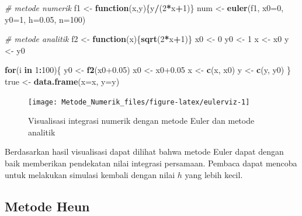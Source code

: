 \documentclass[]{book}
\newenvironment{Shaded}{\begin{snugshade}}{\end{snugshade}}
\newcommand{\CommentTok}[1]{\textcolor[rgb]{0.56,0.35,0.01}{\textit{#1}}}
\newcommand{\ControlFlowTok}[1]{\textcolor[rgb]{0.13,0.29,0.53}{\textbf{#1}}}
\newcommand{\DataTypeTok}[1]{\textcolor[rgb]{0.13,0.29,0.53}{#1}}
\newcommand{\DecValTok}[1]{\textcolor[rgb]{0.00,0.00,0.81}{#1}}
\newcommand{\FloatTok}[1]{\textcolor[rgb]{0.00,0.00,0.81}{#1}}
\newcommand{\KeywordTok}[1]{\textcolor[rgb]{0.13,0.29,0.53}{\textbf{#1}}}
\newcommand{\NormalTok}[1]{#1}
\newcommand{\OperatorTok}[1]{\textcolor[rgb]{0.81,0.36,0.00}{\textbf{#1}}}
\newcommand{\StringTok}[1]{\textcolor[rgb]{0.31,0.60,0.02}{#1}}
\theoremstyle{definition}
\theoremstyle{definition}
\theoremstyle{definition}
\theoremstyle{remark}
\begin{document}
\begin{Shaded}
\begin{Highlighting}[]
\CommentTok{# metode numerik}
\NormalTok{f1 <-}\StringTok{ }\ControlFlowTok{function}\NormalTok{(x,y)\{y}\OperatorTok{/}\NormalTok{(}\DecValTok{2}\OperatorTok{*}\NormalTok{x}\OperatorTok{+}\DecValTok{1}\NormalTok{)\}}
\NormalTok{num <-}\StringTok{ }\KeywordTok{euler}\NormalTok{(f1, }\DataTypeTok{x0=}\DecValTok{0}\NormalTok{, }\DataTypeTok{y0=}\DecValTok{1}\NormalTok{, }\DataTypeTok{h=}\FloatTok{0.05}\NormalTok{, }\DataTypeTok{n=}\DecValTok{100}\NormalTok{)}

\CommentTok{# metode analitik}
\NormalTok{f2 <-}\StringTok{ }\ControlFlowTok{function}\NormalTok{(x)\{}\KeywordTok{sqrt}\NormalTok{(}\DecValTok{2}\OperatorTok{*}\NormalTok{x}\OperatorTok{+}\DecValTok{1}\NormalTok{)\}}
\NormalTok{x0 <-}\StringTok{ }\DecValTok{0}
\NormalTok{y0 <-}\StringTok{ }\DecValTok{1}
\NormalTok{x <-}\StringTok{ }\NormalTok{x0}
\NormalTok{y <-}\StringTok{ }\NormalTok{y0}

\ControlFlowTok{for}\NormalTok{(i }\ControlFlowTok{in} \DecValTok{1}\OperatorTok{:}\DecValTok{100}\NormalTok{)\{}
\NormalTok{  y0 <-}\StringTok{ }\KeywordTok{f2}\NormalTok{(x0}\FloatTok{+0.05}\NormalTok{)}
\NormalTok{  x0 <-}\StringTok{ }\NormalTok{x0}\FloatTok{+0.05}
\NormalTok{  x <-}\StringTok{ }\KeywordTok{c}\NormalTok{(x, x0)}
\NormalTok{  y <-}\StringTok{ }\KeywordTok{c}\NormalTok{(y, y0)}
\NormalTok{\}}
\NormalTok{true <-}\StringTok{ }\KeywordTok{data.frame}\NormalTok{(}\DataTypeTok{x=}\NormalTok{x, }\DataTypeTok{y=}\NormalTok{y)}
\end{Highlighting}
\end{Shaded}

\begin{figure}

{\centering \texttt{[image: Metode\_Numerik\_files/figure-latex/eulerviz-1]} 

}

\caption{Visualisasi integrasi numerik dengan metode Euler dan metode analitik}\label{fig:eulerviz}
\end{figure}

Berdasarkan hasil visualisasi dapat dilihat bahwa metode Euler dapat dengan baik memberikan pendekatan nilai integrasi persamaan. Pembaca dapat mencoba untuk melakukan simulasi kembali dengan nilai \(h\) yang lebih kecil.

\hypertarget{heun}{%
\subsection{Metode Heun}\label{heun}}
\end{document}
